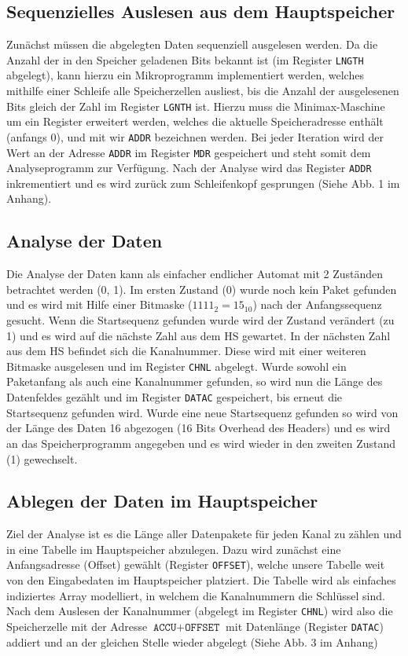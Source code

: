 \documentclass[12pt,titlepage]{article}
\begin{document}
\subsection{Sequenzielles Auslesen aus dem Hauptspeicher}
Zun{\"a}chst m{\"u}ssen die abgelegten Daten sequenziell ausgelesen werden. Da die Anzahl der in den Speicher geladenen Bits
bekannt ist (im Register \texttt{LNGTH} abgelegt), kann hierzu ein Mikroprogramm implementiert werden, welches mithilfe
einer Schleife alle Speicherzellen ausliest, bis die Anzahl der ausgelesenen Bits gleich der Zahl im Register \texttt{LGNTH} ist.
Hierzu muss die Minimax-Maschine um ein Register erweitert werden, welches die aktuelle Speicheradresse enth{\"a}lt (anfangs 0),
und mit wir \texttt{ADDR} bezeichnen werden. Bei jeder Iteration wird der Wert an der Adresse \texttt{ADDR} im Register 
\texttt{MDR} gespeichert und steht somit dem Analyseprogramm zur Verf{\"u}gung. Nach der Analyse wird das Register \texttt{ADDR}
inkrementiert und es wird zur{\"u}ck zum Schleifenkopf gesprungen (Siehe Abb. 1 im Anhang).

\subsection{Analyse der Daten}
Die Analyse der Daten kann als einfacher endlicher Automat mit 2 Zuständen betrachtet werden (0, 1). Im ersten Zustand (0)
wurde noch kein Paket gefunden und es wird mit Hilfe einer Bitmaske ($1111_{2} = 15_{10}$) nach der Anfangssequenz gesucht. 
Wenn die Startsequenz gefunden wurde wird der Zustand verändert (zu 1) und es wird auf die nächste Zahl aus dem HS gewartet. 
In der nächsten Zahl aus dem HS befindet sich die Kanalnummer. Diese wird mit einer weiteren Bitmaske ausgelesen
und im Register \texttt{CHNL} abgelegt.
Wurde sowohl ein Paketanfang als auch eine Kanalnummer gefunden, so wird nun die Länge des Datenfeldes gezählt und im Register \texttt{DATAC} gespeichert, bis erneut die Startsequenz gefunden wird.
Wurde eine neue Startsequenz gefunden so wird von der Länge des Daten 16 abgezogen (16 Bits Overhead des Headers) und
es wird an das Speicherprogramm angegeben und es wird wieder in den zweiten Zustand (1) gewechselt.

\subsection{Ablegen der Daten im Hauptspeicher}
Ziel der Analyse ist es die Länge aller Datenpakete für jeden Kanal zu z{\"a}hlen und in eine Tabelle im Hauptspeicher abzulegen.
Dazu wird zunächst eine Anfangsadresse (Offset) gewählt (Register \texttt{OFFSET}), welche unsere Tabelle weit von den Eingabedaten
im Hauptspeicher platziert. Die Tabelle wird als einfaches indiziertes Array modelliert, in welchem die Kanalnummern die
Schlüssel sind. Nach dem Auslesen der Kanalnummer (abgelegt im Register \texttt{CHNL}) wird also die Speicherzelle mit der Adresse 
$\texttt{ACCU} + \texttt{OFFSET}$ mit Datenlänge (Register \texttt{DATAC}) addiert und an der gleichen Stelle wieder abgelegt (Siehe
Abb. 3 im Anhang)
\end{document}
